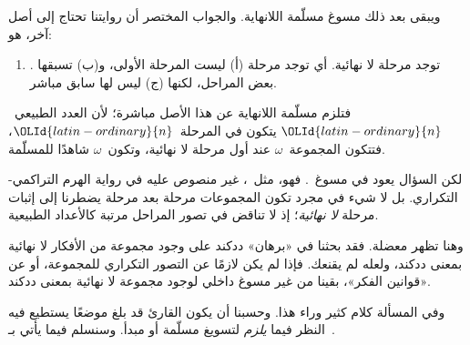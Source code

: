 \documentclass[../../../include/open-logic-section]{subfiles}
\begin{document}
ويبقى بعد ذلك مسوغ مسلّمة اللانهاية. والجواب المختصر أن روايتنا تحتاج
إلى أصل آخر، هو:
\begin{enumerate}
	\item[] \stagesinf. توجد مرحلة لا نهائية. أي توجد مرحلة (أ) ليست المرحلة الأولى، و(ب) تسبقها بعض المراحل، لكنها (ج) ليس لها سابق مباشر.
\end{enumerate}
فتلزم مسلّمة اللانهاية عن هذا الأصل مباشرة؛ لأن العدد الطبيعي~${\OLId{latin-ordinary}{n}}$
يتكون في المرحلة~${\OLId{latin-ordinary}{n}}$، فتتكون المجموعة~$\omega$ عند أول مرحلة لا
نهائية، وتكون~$\omega$ شاهدًا للمسلّمة.

لكن السؤال يعود في مسوغ~\stagesinf. فهو، مثل~\stagessucc، غير منصوص
عليه في رواية الهرم التراكمي-التكراري. بل لا شيء في مجرد تكون
المجموعات مرحلة بعد مرحلة يضطرنا إلى إثبات مرحلة \emph{لا نهائية}؛
إذ لا تناقض في تصور المراحل مرتبة كالأعداد الطبيعية.

وهنا تظهر معضلة. فقد بحثنا في
 «برهان» ددكند على وجود
مجموعة من الأفكار لا نهائية بمعنى ددكند، ولعله لم يقنعك. فإذا لم يكن
\stagesinf{} لازمًا عن التصور التكراري للمجموعة، أو عن «قوانين الفكر»،
بقينا من غير مسوغ داخلي لوجود مجموعة لا نهائية بمعنى ددكند.

وفي المسألة كلام كثير وراء هذا. وحسبنا أن يكون القارئ قد بلغ موضعًا
يستطيع فيه النظر فيما \emph{يلزم} لتسويغ مسلّمة أو مبدأ. وسنسلم فيما
يأتي بـ~\stagesinf{}.
\end{document}
